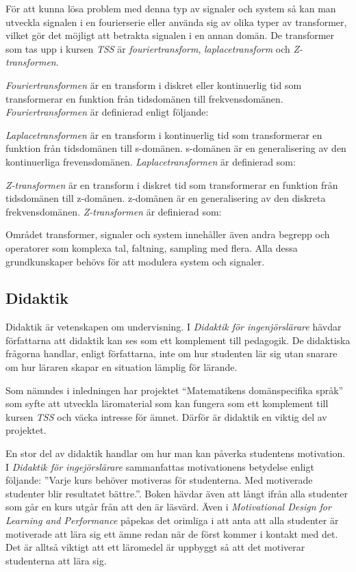 \documentclass[]{article}
\begin{document}
För att kunna lösa problem med denna typ av signaler och system så kan man utveckla signalen i en fourierserie eller
använda sig av olika typer av transformer, vilket gör det möjligt att betrakta signalen i en annan domän. De transformer
som tas upp i kursen \textit{TSS} är \textit{fouriertransform}, \textit{laplacetransform} och \textit{Z-transformen}.


\textit{Fouriertransformen} är en transform i diskret eller kontinuerlig tid som transformerar en funktion från
tidsdomänen till frekvensdomänen. \textit{Fouriertransformen} är definierad enligt följande:

\textit{Laplacetransformen} är en transform i kontinuerlig tid som transformerar en funktion från tidsdomänen till
s-domänen. s-domänen är en generalisering av den kontinuerliga frevensdomänen.  \textit{Laplacetransformen} är
definierad som:


\textit{Z-transformen} är en transform i diskret tid som transformerar en funktion från tidsdomänen till z-domänen.
z-domänen är en generalisering av den diskreta frekvensdomänen. \textit{Z-transformen} är definierad som:

Området transformer, signaler och system innehåller även andra begrepp och operatorer som komplexa tal, faltning,
sampling med flera.  Alla dessa grundkunskaper behövs för att modulera system och signaler.

\subsection{Didaktik}
Didaktik är vetenskapen om undervisning.
I \textit{Didaktik för ingenjörslärare} hävdar författarna att
didaktik kan ses som ett komplement till pedagogik.
De didaktiska frågorna handlar, enligt författarna,
inte om hur studenten lär sig utan snarare om hur läraren skapar en
situation lämplig för lärande.

Som nämndes i inledningen har projektet “Matematikens domänspecifika språk”
som syfte att utveckla läromaterial som kan fungera som ett komplement till
kursen \textit{TSS} och väcka intresse för ämnet.
Därför är didaktik en viktig del av projektet.

En stor del av didaktik handlar om hur man kan påverka studentens motivation.
I \textit{Didaktik för ingejörslärare} sammanfattas motivationens betydelse
enligt följande: ”Varje kurs behöver motiveras för studenterna.
Med motiverade studenter blir resultatet bättre.”.
Boken hävdar även att långt ifrån alla studenter
som går en kurs utgår från att den är läsvärd.
Även i \textit{Motivational Design for Learning and Performance} påpekas det
orimliga i att anta att alla studenter är motiverade att lära sig ett ämne
redan när de först kommer i kontakt med det.
Det är alltså viktigt att ett läromedel är uppbyggt så att det motiverar
studenterna att lära sig.
\end{document}
